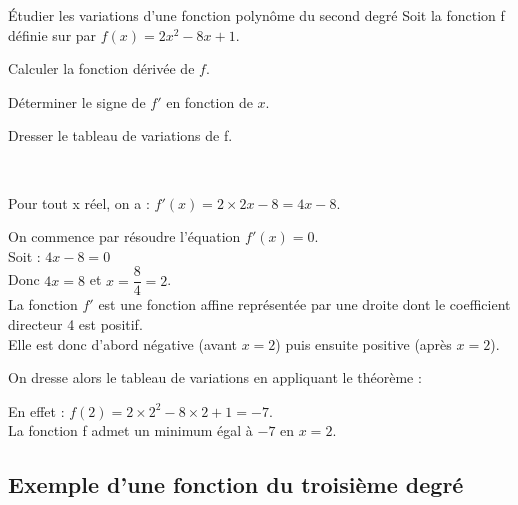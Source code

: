 \begin{bmethodet}{Étudier les variations d'une fonction polynôme du second degré}
Soit la fonction f définie sur \R par $f(x)=2x^2-8x+1$.
\begin{enumMet}
	\item Calculer la fonction dérivée de $f$.
	\item Déterminer le signe de $f'$ en fonction de $x$.
	\item Dresser le tableau de variations de f.
\end{enumMet}
\ \\
{}
\begin{enumMet}
\item Pour tout x réel, on a : $f'(x)=2\times 2x-8=4x-8$.
\item On commence par résoudre l'équation $f'(x)=0$.\\
Soit : $4x-8=0$\\
Donc $4x=8$  et $x= \dfrac{8}{4}=2$.\\
La fonction $f'$ est une fonction affine représentée par une droite dont le coefficient directeur 4 est positif.\\
Elle est donc d'abord négative (avant $x=2$) puis ensuite positive (après $x=2$).\\
\item On dresse alors le tableau de variations en appliquant le théorème :\\

\begin{center}
\end{center}
\newpage
En effet : $f(2)=2\times 2^2-8\times 2+1=-7$.\\
La fonction f admet un minimum égal à $-7$ en $x=2$.\\
\end{enumMet}
\end{bmethodet}

\subsection{Exemple d'une fonction du troisième degré}

